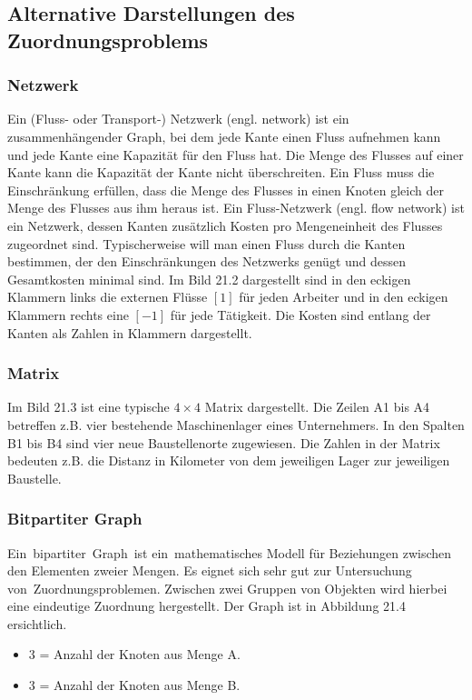 \subsection{Alternative Darstellungen des Zuordnungsproblems
\label{munkres:subsection:bonorum}}
\subsubsection{Netzwerk}
Ein (Fluss- oder Transport-) Netzwerk (engl. network) ist ein zusammenhängender Graph, bei dem jede Kante einen Fluss aufnehmen kann und jede Kante eine Kapazität für den Fluss hat. Die Menge des Flusses auf einer Kante kann die Kapazität der Kante nicht überschreiten. Ein Fluss muss die Einschränkung erfüllen, dass die Menge des Flusses in einen Knoten gleich der Menge des Flusses aus ihm heraus ist. Ein Fluss-Netzwerk (engl. flow network) ist ein Netzwerk, dessen Kanten zusätzlich Kosten pro Mengeneinheit des Flusses zugeordnet sind. Typischerweise will man einen Fluss durch die Kanten bestimmen, der den Einschränkungen des Netzwerks genügt und dessen Gesamtkosten minimal sind. Im Bild 21.2 dargestellt sind in den eckigen Klammern links die externen Flüsse $[1]$ für jeden Arbeiter und in den eckigen Klammern rechts eine $[-1]$ für jede Tätigkeit. Die Kosten sind entlang der Kanten als Zahlen in Klammern dargestellt.  
\subsubsection{Matrix}
Im Bild 21.3 ist eine typische $4\times 4$ Matrix dargestellt. Die Zeilen A1 bis A4 betreffen z.B. vier bestehende Maschinenlager eines Unternehmers. In den Spalten B1 bis B4 sind vier neue Baustellenorte zugewiesen. Die Zahlen in der Matrix bedeuten z.B. die Distanz in Kilometer von dem jeweiligen Lager zur jeweiligen Baustelle.
\subsubsection{Bitpartiter Graph}
Ein bipartiter Graph ist ein mathematisches Modell für Beziehungen
zwischen den Elementen zweier Mengen. Es eignet sich sehr gut zur Untersuchung von Zuordnungsproblemen. Zwischen zwei Gruppen von Objekten wird hierbei eine eindeutige Zuordnung hergestellt. Der Graph ist in Abbildung 21.4 ersichtlich.
\begin{itemize}
\item 3 = Anzahl der Knoten aus Menge A.
\item 3 = Anzahl der Knoten aus Menge B.
\end{itemize}


